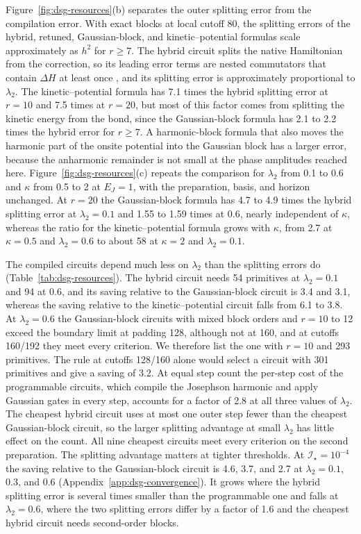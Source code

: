 \documentclass[pra,twocolumn,superscriptaddress,nofootinbib,floatfix]{revtex4-2}
\theoremstyle{remark}
\begin{document}
Figure~\ref{fig:dsg-resources}(b) separates the outer splitting error from the compilation error. With exact blocks at local cutoff 80, the splitting errors of the hybrid, retuned, Gaussian-block, and kinetic--potential formulas scale approximately as \(h^2\) for \(r\ge7\). The hybrid circuit splits the native Hamiltonian from the correction, so its leading error terms are nested commutators that contain \(\Delta H\) at least once \cite{Childs2021Trotter}, and its splitting error is approximately proportional to \(\lambda_2\). The kinetic--potential formula has 7.1 times the hybrid splitting error at \(r=10\) and 7.5 times at \(r=20\), but most of this factor comes from splitting the kinetic energy from the bond, since the Gaussian-block formula has 2.1 to 2.2 times the hybrid error for \(r\ge7\). A harmonic-block formula that also moves the harmonic part of the onsite potential into the Gaussian block has a larger error, because the anharmonic remainder is not small at the phase amplitudes reached here. Figure~\ref{fig:dsg-resources}(c) repeats the comparison for \(\lambda_2\) from 0.1 to 0.6 and \(\kappa\) from 0.5 to 2 at \(E_J=1\), with the preparation, basis, and horizon unchanged. At \(r=20\) the Gaussian-block formula has 4.7 to 4.9 times the hybrid splitting error at \(\lambda_2=0.1\) and 1.55 to 1.59 times at 0.6, nearly independent of \(\kappa\), whereas the ratio for the kinetic--potential formula grows with \(\kappa\), from 2.7 at \(\kappa=0.5\) and \(\lambda_2=0.6\) to about 58 at \(\kappa=2\) and \(\lambda_2=0.1\).

The compiled circuits depend much less on \(\lambda_2\) than the splitting errors do (Table~\ref{tab:dsg-resources}). The hybrid circuit needs 54 primitives at \(\lambda_2=0.1\) and 94 at 0.6, and its saving relative to the Gaussian-block circuit is 3.4 and 3.1, whereas the saving relative to the kinetic--potential circuit falls from 6.1 to 3.8. At \(\lambda_2=0.6\) the Gaussian-block circuits with mixed block orders and \(r=10\) to 12 exceed the boundary limit at padding 128, although not at 160, and at cutoffs 160/192 they meet every criterion. We therefore list the one with \(r=10\) and 293 primitives. The rule at cutoffs 128/160 alone would select a circuit with 301 primitives and give a saving of 3.2. At equal step count the per-step cost of the programmable circuits, which compile the Josephson harmonic and apply Gaussian gates in every step, accounts for a factor of 2.8 at all three values of \(\lambda_2\). The cheapest hybrid circuit uses at most one outer step fewer than the cheapest Gaussian-block circuit, so the larger splitting advantage at small \(\lambda_2\) has little effect on the count. All nine cheapest circuits meet every criterion on the second preparation. The splitting advantage matters at tighter thresholds. At \(\mathcal I_\star=10^{-4}\) the saving relative to the Gaussian-block circuit is 4.6, 3.7, and 2.7 at \(\lambda_2=0.1\), 0.3, and 0.6 (Appendix~\ref{app:dsg-convergence}). It grows where the hybrid splitting error is several times smaller than the programmable one and falls at \(\lambda_2=0.6\), where the two splitting errors differ by a factor of 1.6 and the cheapest hybrid circuit needs second-order blocks.
\end{document}
